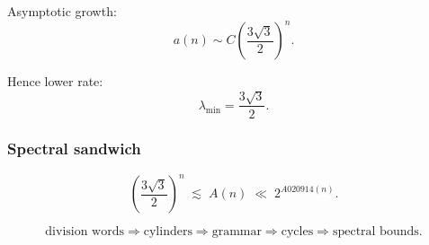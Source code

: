 \documentclass[12pt, oneside]{article}
\numberwithin{equation}{section}
\theoremstyle{definition}
\theoremstyle{plain}
\theoremstyle{remark}
\begin{document}
Asymptotic growth:
\[
a(n) \sim C\left(\frac{3\sqrt{3}}{2}\right)^n.
\]

Hence lower rate:
\[
\lambda_{\min} = \frac{3\sqrt{3}}{2}.
\]

\subsubsection*{Spectral sandwich}

\[
\left(\frac{3\sqrt{3}}{2}\right)^n
\;\lesssim\;
A(n)
\;\ll\;
2^{A020914(n)}.
\]

\[
\text{division words}
\Rightarrow
\text{cylinders}
\Rightarrow
\text{grammar}
\Rightarrow
\text{cycles}
\Rightarrow
\text{spectral bounds}.
\]


\clearpage


\end{document}
